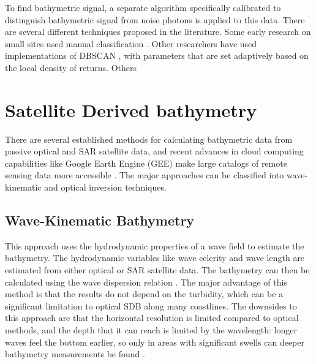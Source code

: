 To find bathymetric signal, a separate algorithm specifically calibrated to distinguish bathymetric signal from noise photons is applied to this data. There are several different techniques proposed in the literature. Some early research on small sites used manual classification \parencite{Forfinski-Sarkozi2016}. Other researchers have used implementations of DBSCAN \parencite{Ester1996}, with parameters that are set adaptively based on the local density of returns. Others


\section{Satellite Derived bathymetry}
There are several established methods for calculating bathymetric data from passive optical and SAR satellite data, and recent advances in cloud computing capabilities like Google Earth Engine (GEE) \parencite{Gorelick2017a} make large catalogs of remote sensing data more accessible \parencite{Pike2019,Turner2021}. The major approaches can be classified into wave-kinematic and optical inversion techniques.

\subsection{Wave-Kinematic Bathymetry}
This approach uses the hydrodynamic properties of a wave field to estimate the bathymetry. The hydrodynamic variables like wave celerity and wave length are estimated from either optical or SAR satellite data. The bathymetry can then be calculated using the wave dispersion relation \cite{Almar2021e}. The major advantage of this method is that the results do not depend on the turbidity, which can be a significant limitation to optical SDB along many coastlines. The downsides to this approach are that the horizontal resolution is limited compared to optical methods, and the depth that it can reach is limited by the wavelength: longer waves feel the bottom earlier, so only in areas with significant swells can deeper bathymetry measurements be found \parencite{Almar2021e}.

